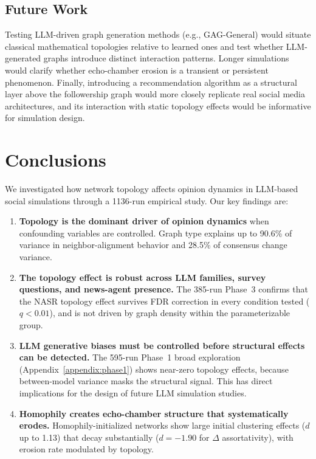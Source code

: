 \documentclass[11pt]{article}
\begin{document}
\subsection{Future Work}

Testing LLM-driven graph generation methods (e.g., GAG-General) would situate classical mathematical topologies relative to learned ones and test whether LLM-generated graphs introduce distinct interaction patterns. Longer simulations would clarify whether echo-chamber erosion is a transient or persistent phenomenon. Finally, introducing a recommendation algorithm as a structural layer above the followership graph would more closely replicate real social media architectures, and its interaction with static topology effects would be informative for simulation design.

\section{Conclusions}

We investigated how network topology affects opinion dynamics in LLM-based social simulations through a 1136-run empirical study. Our key findings are:

\begin{enumerate}
    \item \textbf{Topology is the dominant driver of opinion dynamics} when confounding variables are controlled. Graph type explains up to 90.6\% of variance in neighbor-alignment behavior and 28.5\% of consensus change variance.

    \item \textbf{The topology effect is robust across LLM families, survey questions, and news-agent presence.} The 385-run Phase~3 confirms that the NASR topology effect survives FDR correction in every condition tested ($q < 0.01$), and is not driven by graph density within the parameterizable group.

    \item \textbf{LLM generative biases must be controlled before structural effects can be detected.} The 595-run Phase~1 broad exploration (Appendix~\ref{appendix:phase1}) shows near-zero topology effects, because between-model variance masks the structural signal. This has direct implications for the design of future LLM simulation studies.

    \item \textbf{Homophily creates echo-chamber structure that systematically erodes.} Homophily-initialized networks show large initial clustering effects ($d$ up to 1.13) that decay substantially ($d = -1.90$ for $\Delta$ assortativity), with erosion rate modulated by topology.
\end{enumerate}
\end{document}
